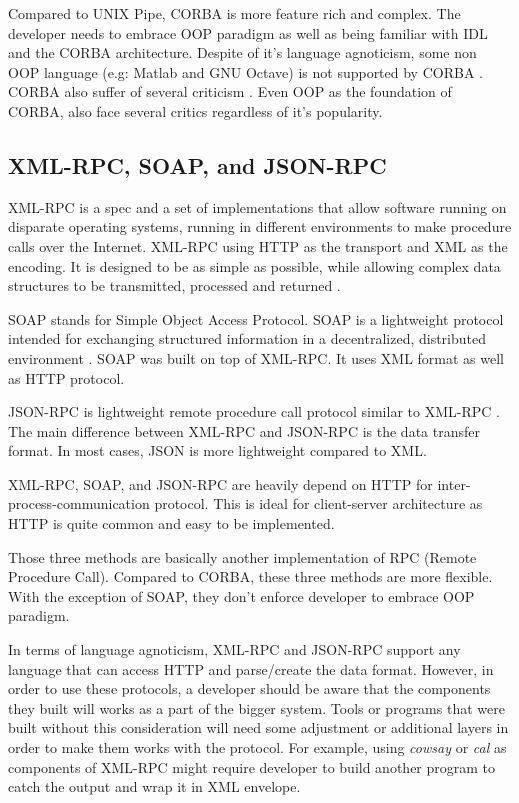 \documentclass[conference]{IEEEtran}
\begin{document}
Compared to UNIX Pipe, CORBA is more feature rich and complex. The developer needs to 
embrace OOP paradigm as well as being familiar with IDL and the CORBA architecture. 
Despite of it's language agnoticism, some non OOP language (e.g: Matlab and GNU Octave) 
is not supported by CORBA \cite{feilhauer2016def}. CORBA also suffer of several 
criticism \cite{henning2006rise}. Even OOP as the foundation of CORBA, also face several 
critics \cite{hadar2013intuition} regardless of it's popularity.


\subsection{XML-RPC, SOAP, and JSON-RPC}

XML-RPC is a spec and a set of implementations that allow software running on 
disparate operating systems, running in different environments to make procedure 
calls over the Internet. XML-RPC using HTTP as the transport and XML as the encoding. It is designed to be as simple as possible, while allowing complex data structures to be transmitted, processed and returned \cite{xmlrpc}.

SOAP stands for Simple Object Access Protocol. SOAP is a lightweight protocol 
intended for exchanging structured information in a decentralized, distributed 
environment \cite{soap}. SOAP was built on top of XML-RPC. It uses XML format as 
well as HTTP protocol.

JSON-RPC is lightweight remote procedure call protocol similar to XML-RPC 
\cite{jsonrpc}. The main difference between XML-RPC and JSON-RPC is the data transfer
format. In most cases, JSON is more lightweight compared to XML.

XML-RPC, SOAP, and JSON-RPC are heavily depend on HTTP for inter-process-communication 
protocol. This is ideal for client-server architecture as HTTP is quite common and
easy to be implemented.

Those three methods are basically another implementation of RPC (Remote Procedure Call). 
Compared to CORBA, these three methods are more flexible. With the exception of SOAP,
they don't enforce developer to embrace OOP paradigm.

In terms of language agnoticism, XML-RPC and JSON-RPC support any language that can
access HTTP and parse/create the data format. However, in order to use these protocols,
a developer should be aware that the components they built will works as a part of the
bigger system. Tools or programs that were built without this consideration will need
some adjustment or additional layers in order to make them works with the protocol.
For example, using {\it{cowsay}} or {\it{cal}} as components of XML-RPC might require
developer to build another program to catch the output and wrap it in XML envelope.
\end{document}

